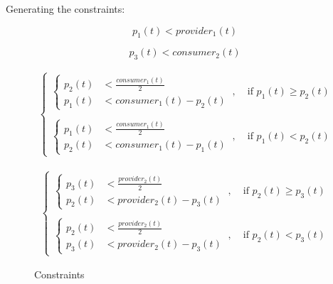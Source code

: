 \documentclass[a4paper, 12pt]{article}
\begin{document}
Generating the constraints: 
\begin{figure}[h]
\centering

\begin{equation}
  p_1(t) < provider_1(t)
\end{equation}

\begin{equation}
  p_3(t) < consumer_2(t)
\end{equation}

\begin{equation}
\begin{split}
  \begin{cases}
    \begin{cases}
      p_2(t) &< \displaystyle\frac{consumer_1(t)}{2}\\
      p_1(t) &< consumer_1(t) - p_2(t)
    \end{cases}
    \ ,&\;\mbox{if } p_1(t) \geq p_2(t)\\\\
    \begin{cases}
      p_1(t) &< \displaystyle\frac{consumer_1(t)}{2}\\
      p_2(t) &< consumer_1(t) - p_1(t)
    \end{cases}
    \ ,&\;\mbox{if } p_1(t) < p_2(t)
  \end{cases}
\end{split}
\end{equation}

\begin{equation}
\begin{split}
  \begin{cases}
    \begin{cases}
      p_3(t) &< \displaystyle\frac{provider_2(t)}{2}\\
      p_2(t) &< provider_2(t) - p_3(t)
    \end{cases}
    \ ,&\;\mbox{if } p_2(t) \geq p_3(t)\\\\
    \begin{cases}
      p_2(t) &< \displaystyle\frac{provider_2(t)}{2}\\
      p_3(t) &< provider_2(t) - p_3(t)
    \end{cases}
    \ ,&\;\mbox{if } p_2(t) < p_3(t)
  \end{cases}
\end{split}
\end{equation}

\caption{Constraints}
\label{fig:Constraints}
\end{figure}
\end{document}
